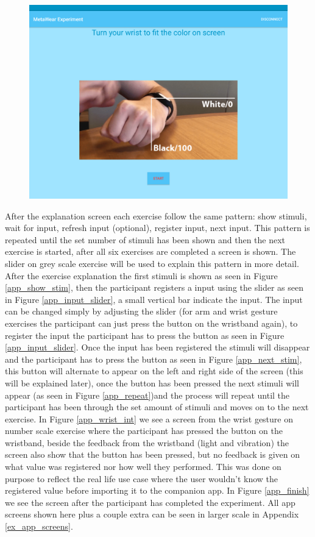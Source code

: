 \begin{figure}[h!]
    \centering
  \includegraphics[width=0.6\linewidth]{figures/tablet_screen13.png}
  \label{app_wrist_explain}
\end{figure}


After the explanation screen each exercise follow the same pattern: show stimuli, wait for input, refresh input (optional), register input, next input. This pattern is repeated until the set number of stimuli has been shown and then the next exercise is started, after all six exercises are completed a  screen is shown. The slider on grey scale exercise will be used to explain this pattern in more detail. After the exercise explanation the first stimuli is shown as seen in Figure \ref{app_show_stim}, then the participant registers a input using the slider as seen in Figure \ref{app_input_slider}, a small vertical bar indicate the input. The input can be changed simply by adjusting the slider (for arm and wrist gesture exercises the participant can just press the button on the wristband again), to register the input the participant has to press the  button as seen in Figure \ref{app_input_slider}. Once the input has been registered the stimuli will disappear and the participant has to press the  button as seen in Figure \ref{app_next_stim}, this button will alternate to appear on the left and right side of the screen (this will be explained later), once the button has been pressed the next stimuli will appear (as seen in Figure \ref{app_repeat})and the process will repeat until the participant has been through the set amount of stimuli and moves on to the next exercise. In Figure \ref{app_wrist_int} we see a screen from the wrist gesture on number scale exercise where the participant has pressed the button on the wristband, beside the feedback from the wristband (light and vibration) the screen also show that the button has been pressed, but no feedback is given on what value was registered nor how well they performed. This was done on purpose to reflect the real life use case where the user wouldn't know the registered value before importing it to the companion app. In Figure \ref{app_finish} we see the  screen after the participant has completed the experiment. All app screens shown here plus a couple extra can be seen in larger scale in Appendix \ref{ex_app_screens}.


